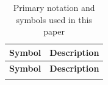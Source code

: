     {\small
        \setlength{\LTleft}{0pt}
        \setlength{\LTright}{0pt}
        \setlength{\tabcolsep}{3pt}
        \begin{longtable}{p{}p{}}
            \caption{Primary notation and symbols used in this paper}\label{tab:notation}                                                      \\
            \toprule
            \textbf{Symbol}                                             & \textbf{Description}                                                 \\
            \midrule
            \endfirsthead

            \toprule
            \textbf{Symbol}                                             & \textbf{Description}                                                 \\
            \midrule
            \endhead

            \bottomrule
            \endfoot


\end{longtable}}
